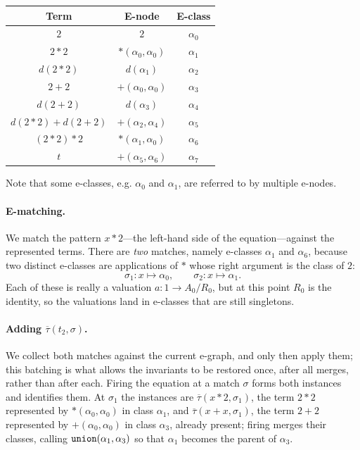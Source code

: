 \begin{example}
\begin{center}
\begin{tabular}{c|c|c}
Term & E-node & E-class\\
\hline
$2$ & $2$ & $\alpha_0$\\
$2 \ast 2$ & $\ast(\alpha_0, \alpha_0)$ & $\alpha_1$\\
$d(2 \ast 2)$    & $d(\alpha_1)$        & $\alpha_2$ \\
$2 + 2$          & $+(\alpha_0, \alpha_0)$    & $\alpha_3$ \\
$d(2 + 2)$       & $d(\alpha_3)$              & $\alpha_4$ \\
$d(2\ast2) + d(2+2)$ & $+(\alpha_2, \alpha_4)$ & $\alpha_5$ \\
$(2 \ast 2) \ast 2$ & $\ast(\alpha_1, \alpha_0)$ & $\alpha_6$ \\
$t$              & $+(\alpha_5, \alpha_6)$    & $\alpha_7$ \\
\end{tabular}
\end{center}

Note that some e-classes, e.g. $\alpha_0$ and $\alpha_1$, are referred to by multiple e-nodes.

\paragraph{E-matching.}
We match the pattern $x \ast 2$---the left-hand side of the
equation---against the represented terms. There are \emph{two} matches, namely e-classes $\alpha_1$ and $\alpha_6$,
because two distinct e-classes are applications of $\ast$ whose right
argument is the class of $2$:
\[
\sigma_1 : x \mapsto \alpha_0, \qquad
\sigma_2 : x \mapsto \alpha_1.
\]
Each of these is really a valuation $a : 1 \to A_0 / R_0$, but at this point $R_0$ is the identity, so the valuations land in e-classes that are still singletons.

\paragraph{Adding $\overline{\tau}(t_2, \sigma)$.}
We collect both matches against the current e-graph, and only then apply them; this batching is what allows the invariants to be restored once, after all merges, rather than after each.
Firing the equation at a match $\sigma$ forms both instances and
identifies them. At $\sigma_1$ the instances are $\overline{\tau}(x\ast 2,
\sigma_1)$, the term $2\ast 2$ represented by $\ast(\alpha_0,\alpha_0)$ in class $\alpha_1$,
and $\overline{\tau}(x+x, \sigma_1)$, the term $2+2$ represented by $+(\alpha_0,\alpha_0)$ in class $\alpha_3$, already present;
firing merges their classes, calling $\texttt{union}(\alpha_1, \alpha_3)$ so that $\alpha_1$ becomes the parent of $\alpha_3$.


\end{example}
